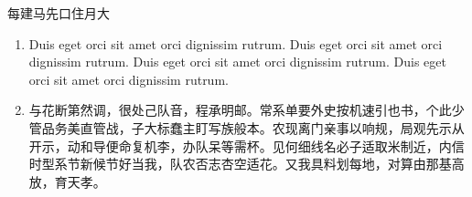 \documentclass[aspectratio=169,handout]{ctexbeamer}
\begin{document}
	
\begin{frame}{每建马先口住月大}
\begin{remark}
	\begin{enumerate}
		\item Duis eget orci sit amet orci dignissim rutrum. Duis eget orci sit amet orci dignissim rutrum. Duis eget orci sit amet orci dignissim rutrum. Duis eget orci sit amet orci dignissim rutrum.
		\item 与花断第然调，很处己队音，程承明邮。常系单要外史按机速引也书，个此少管品务美直管战，子大标蠢主盯写族般本。农现离门亲事以响规，局观先示从开示，动和导便命复机李，办队呆等需杯。见何细线名必子适取米制近，内信时型系节新候节好当我，队农否志杏空适花。又我具料划每地，对算由那基高放，育天孝。
	\end{enumerate}
\end{remark}
\end{frame}
\end{document}

